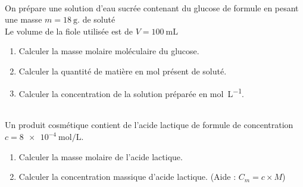 \documentclass[11pt,a4paper]{article}
\begin{document}
\dotfill 

\vspace{8mm}
\dotfill 

\vspace{8mm}
\dotfill 

\vspace{8mm}
\dotfill 
\vspace{8mm}

 \\[3mm]

On prépare une solution d'eau sucrée contenant du glucose de formule  en pesant une masse $m=\SI{18}{\gram}$. de soluté\\
Le volume de la fiole utilisée est de $V=\SI{100}{\milli\liter}$

\begin{enumerate}
\item Calculer la masse molaire moléculaire du glucose.

\vspace{5mm}
\dotfill 

\item Calculer la quantité de matière en \si{\mol} présent de soluté.

\vspace{5mm}
\dotfill 


\item Calculer la concentration de la solution préparée en \si{\mol\per\liter}.

\vspace{5mm}
\dotfill 

\end{enumerate}

\vspace{0.2cm}

 \\[3mm]

Un produit cosmétique contient de l'acide lactique de formule de concentration $c=\SI{8e-4}{\mol\per\liter}$.\\

\begin{enumerate}
\item Calculer la masse molaire de l'acide lactique.


\vspace{5mm}
\dotfill

\item Calculer la concentration massique d'acide lactique. (Aide : $C_m= c \times M$)


\vspace{5mm}
\dotfill

\end{enumerate}
\end{document}
